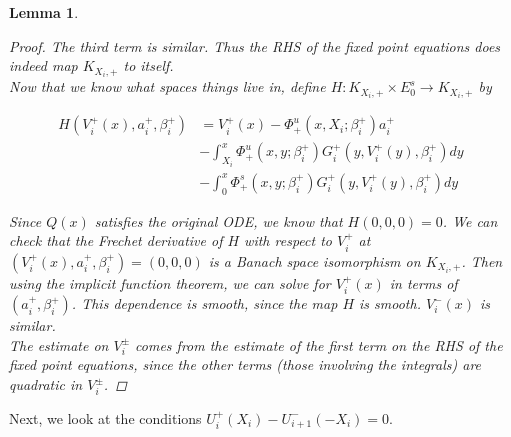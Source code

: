 \documentclass[12pt]{article}
\newtheorem{lemma}{Lemma}
\begin{document}
\begin{lemma}
\begin{proof}
The third term is similar. Thus the RHS of the fixed point equations does indeed map $K_{X_i, +}$ to itself.\\

Now that we know what spaces things live in, define 
$H: K_{X_i, +} \times E_0^s \rightarrow K_{X_i, +}$ by

\begin{align*}
H(V_i^+(x), a_i^+, \beta_i^+) &= V_i^+(x) - \Phi^u_+(x, X_i; \beta_i^+) a_i^+  \\
&- \int_{X_i}^x \Phi_+^u(x, y; \beta_i^+) G_i^+(y, V_i^+(y),\beta_i^+)dy \\
&- \int_0^x \Phi_+^s(x, y; \beta_i^+) G_i^+(y, V_i^+(y),\beta_i^+)dy 
\end{align*}

Since $Q(x)$ satisfies the original ODE, we know that $H(0, 0, 0) = 0$. We can check that the Frechet derivative of $H$ with respect to $V_i^+$ at $(V_i^+(x), a_i^+, \beta_i^+) = (0, 0, 0)$ is a Banach space isomorphism on $K_{X_i, +}$. Then using the implicit function theorem, we can solve for $V_i^+(x)$ in terms of $(a_i^+, \beta_i^+)$. This dependence is smooth, since the map $H$ is smooth. $V_i^-(x)$ is similar. \\

The estimate on $V_i^\pm$ comes from the estimate of the first term on the RHS of the fixed point equations, since the other terms (those involving the integrals) are quadratic in $V_i^\pm$. 

\end{proof}
\end{lemma}

Next, we look at the conditions $U_i^+(X_i) - U_{i+1}^-(-X_i) = 0$.

\end{document}
